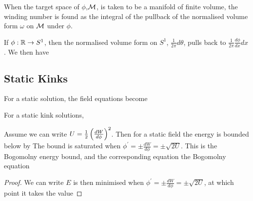 \documentclass{article}
\begin{document}
\begin{prop}
When the target space of $\phi$,$\mathcal{M}$, is taken to be a manifold of finite volume, the winding number is found as the integral of the pullback of the normalised volume form $\omega$ on $\mathcal{M}$ under $\phi$. 
\end{prop}

\begin{example}
If $\phi:\mathbb{R} \to S^1$, then the normalised volume form on $S^1$, $\frac{1}{2\pi}d\theta$, pulls back to $\frac{1}{2\pi}\frac{d\phi}{dx}dx$. We then have 
\end{example}

\subsection{Static Kinks}

For a static solution, the field equations become

\begin{theorem}
For a static kink solutions, 
\end{theorem}

\begin{prop}
Assume we can write $U=\frac{1}{2}\left( \frac{dW}{d\phi} \right)^2$. Then for a static field the energy is bounded below by
The bound is saturated when $\phi^\prime = \pm \frac{dW}{d\phi} = \pm\sqrt{2U}$. This is the Bogomolny energy bound, and the corresponding equation the Bogomolny equation
\end{prop}
\begin{proof}
We can write 
$E$ is then minimised when $\phi^\prime = \pm \frac{dW}{d\phi} = \pm\sqrt{2U}$, at which point it takes the value 
\end{proof}
\end{document}
